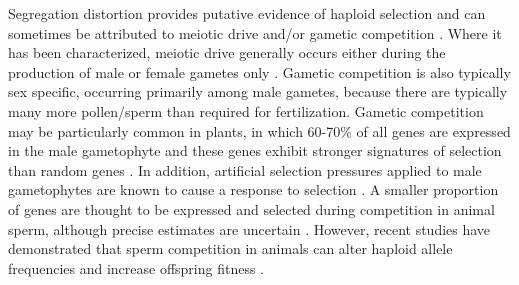 \documentclass[12pt]{article}
\begin{document}
Segregation distortion provides putative evidence of haploid selection and can sometimes be attributed to meiotic drive and/or gametic competition \citep{Lalanne2004,Fishman2005,Leppala2008,Leppala2013,Didion2015,Didion2016}.
Where it has been characterized, meiotic drive generally occurs either during the production of male or female gametes only \citep{Ubeda:2005gw,Lindholm:2016cw}.
Gametic competition is also typically sex specific, occurring primarily among male gametes, because there are typically many more pollen/sperm than required for fertilization.
Gametic competition may be particularly common in plants, in which 60-70\% of all genes are expressed in the male gametophyte and these genes exhibit stronger signatures of selection than random genes \citep{Borg:2009jpa,Arunkumar:2013iq,Gossmann:2014dua}.
In addition, artificial selection pressures applied to male gametophytes are known to cause a response to selection \citep[e.g.,][]{Hormaza:1996cv,Ravikumar:2003uo,Hedhly:2004iv,Clarke:2004ir}. 
A smaller proportion of genes are thought to be expressed and selected during competition in animal sperm, although precise estimates are uncertain \citep{Zheng:2001fi,JOSEPH:2004haa,Vibranovski:2010et}. 
However, recent studies have demonstrated that sperm competition in animals can alter haploid allele frequencies and increase offspring fitness \citep{Immler:2014im,Alavioon2017}.
\end{document}
